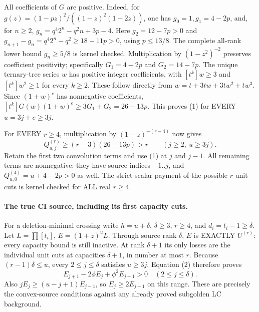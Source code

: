 All coefficients of $G$ are positive. Indeed, for
$g(z)=(1-pz)^2/((1-z)^2(1-2z))$, one has
$g_0=1,g_1=4-2p$, and, for $n\ge2$,
$g_n=q^4 2^n-q^2n+3p-4$.
Here $g_2=12-7p>0$ and
$g_{n+1}-g_n=q^4 2^n-q^2\ge18-11p>0$, using $p\le13/8$.
The complete all-rank lower bound $g_n\ge5/8$ is kernel checked.
Multiplication by $(1-z^2)^{-2}$ preserves coefficient positivity;
specifically $G_1=4-2p$ and $G_2=14-7p$.
The unique ternary-tree series $w$ has positive integer coefficients,
with $[t^k]w\ge3$ and $[t^k]w^2\ge1$ for every $k\ge2$.
These follow directly from $w=t+3tw+3tw^2+tw^3$.
Since $(1+w)^e$ has nonnegative coefficients,
$[t^k]G(w)(1+w)^e\ge3G_1+G_2=26-13p$.
This proves (1) for EVERY $u=3j+e\ge3j$.

For EVERY $r\ge4$, multiplication by $(1-z)^{-(r-4)}$ now gives
\[
 Q^{(r)}_{u,j}\ge(r-3)(26-13p)>r
                  \qquad(j\ge2,\ u\ge3j).          \tag{2}
\]
Retain the first two convolution terms and use (1) at $j$ and $j-1$.
All remaining terms are nonnegative: they have source indices
$-1..j$, and $Q^{(4)}_{u,0}=u+4-2p>0$ as well.
The strict scalar payment of the possible $r$ unit cuts is kernel
checked for ALL real $r\ge4$.

\paragraph{The true CI source, including its first capacity cuts.}
For a deletion-minimal crossing write $h=u+\delta$, $\delta\ge3$,
$r\ge4$, and $d_i=t_i-1\ge\delta$.
Let $L=\prod[t_i]$, $E=(1+z)^uL$.
Through source rank $\delta$, $E$ is EXACTLY $U^{(r)}$:
every capacity bound is still inactive. At rank $\delta+1$ its
only losses are the individual unit cuts at capacities $\delta+1$,
in number at most $r$. Because $(r-1)\delta\le u$, every
$2\le j\le\delta$ satisfies $u\ge3j$. Equation (2) therefore
proves
\[
 E_{j+1}-2\phi E_j+\phi^2E_{j-1}>0
                          \quad(2\le j\le\delta).  \tag{3}
\]
Also $jE_j\ge(u-j+1)E_{j-1}$, so $E_j\ge2E_{j-1}$
on this range. These are precisely the convex-source conditions
against any already proved subgolden LC background.

